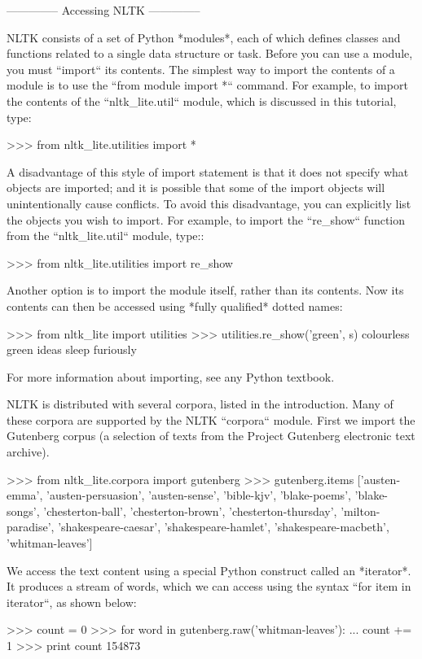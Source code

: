 \documentclass[presentation]{beamer}
\begin{document}
--------------
Accessing NLTK
--------------

NLTK consists of a set of Python *modules*, each of which defines
classes and functions related to a single data structure or task.
Before you can use a module, you must ``import`` its contents.  The
simplest way to import the contents of a module is to use the ``from
module import *`` command.  For example, to import the contents of the
``nltk_lite.util`` module, which is discussed in this tutorial, type:

  >>> from nltk_lite.utilities import *

A disadvantage of this style of import statement is that it does not
specify what objects are imported; and it is possible that some of the
import objects will unintentionally cause conflicts.  To avoid this
disadvantage, you can explicitly list the objects you wish to import.
For example, to import the ``re_show`` function from the
``nltk_lite.util`` module, type::

  >>> from nltk_lite.utilities import re_show

Another option is to import the module itself, rather than
its contents.  Now its contents can then be accessed
using *fully qualified* dotted names:

  >>> from nltk_lite import utilities
  >>> utilities.re_show('green', s)
  colourless {green} ideas sleep furiously

For more information about importing, see any Python textbook.

NLTK is distributed with several corpora, listed in the introduction.
Many of these corpora are supported by the NLTK ``corpora`` module.
First we import the Gutenberg corpus (a selection of texts from
the Project Gutenberg electronic text archive).

  >>> from nltk_lite.corpora import gutenberg
  >>> gutenberg.items
  ['austen-emma', 'austen-persuasion', 'austen-sense', 'bible-kjv', 'blake-poems', 'blake-songs', 'chesterton-ball', 'chesterton-brown', 'chesterton-thursday', 'milton-paradise', 'shakespeare-caesar', 'shakespeare-hamlet', 'shakespeare-macbeth', 'whitman-leaves']

We access the text content using a special Python construct called an
*iterator*.  It produces a stream of words, which we can access using
the syntax ``for item in iterator``, as shown below:

  >>> count = 0
  >>> for word in gutenberg.raw('whitman-leaves'):
  ...     count += 1
  >>> print count
  154873
\end{document}
